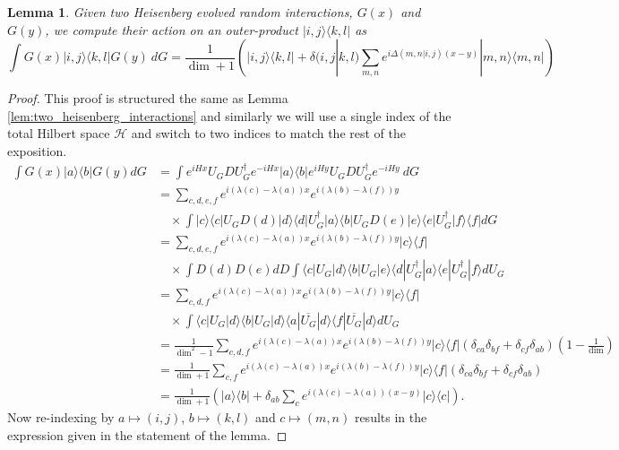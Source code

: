 \documentclass{article}
\newtheorem{lemma}[theorem]{Lemma}
\newcommand{\ket}[1]{|#1\rangle}
\newcommand{\bra}[1]{\langle #1|}
\newcommand{\ketbra}[2]{| #1\rangle\! \langle #2|}
\newcommand{\parens}[1]{\left( #1 \right)}
\newcommand{\hilb}{\mathcal{H}}
\begin{document}
\begin{lemma} \label{lem:sandwiched_interaction}
    Given two Heisenberg evolved random interactions, $G(x)$ and $G(y)$, we compute their action on an outer-product $\ketbra{i,j}{k,l}$ as
    \begin{equation}
        \int G(x) \ketbra{i,j}{k,l} G(y) ~dG = \frac{1}{\dim + 1} \parens{\ketbra{i,j}{k,l} + \delta(i,j|k,l) \sum_{m,n} e^{i \Delta(m,n | i,j) (x-y)} \ketbra{m,n}{m,n}}
    \end{equation}
\end{lemma}
\begin{proof}
This proof is structured the same as Lemma \ref{lem:two_heisenberg_interactions} and similarly we will use a single index of the total Hilbert space $\hilb$ and switch to two indices to match the rest of the exposition.
    \begin{align}
        \int G(x) \ketbra{a}{b} G(y) dG &=  \int e^{i H x} U_G D U_G^{\dagger} e^{-i H x} \ketbra{a}{b} e^{i H y} U_G D U_G^\dagger e^{-i H y} ~dG \\
        &= \sum_{c, d, e, f} e^{i (\lambda(c) - \lambda(a))x} e^{i (\lambda(b) - \lambda(f))y} \nonumber \\
        &\quad \times \int \ketbra{c}{c} U_G D(d) \ketbra{d}{d} U_G^\dagger \ketbra{a}{b} U_G D(e) \ketbra{e}{e} U_G^\dagger \ketbra{f}{f} dG \\
        &= \sum_{c, d, e, f}  e^{i (\lambda(c) - \lambda(a))x} e^{i (\lambda(b) - \lambda(f))y} \ketbra{c}{f} \nonumber \\
        &\quad \times \int D(d) D(e) dD \int \bra{c} U_G \ket{d} \bra{b} U_G \ket{e} \bra{d} U_G^\dagger \ket{a} \bra{e} U_G^\dagger \ket{f} dU_G \\
        &=  \sum_{c,d,f} e^{i (\lambda(c) - \lambda(a))x} e^{i (\lambda(b) - \lambda(f))y} \ketbra{c}{f} \nonumber \\ 
        &\quad \times \int \bra{c} U_G \ket{d} \bra{b} U_G \ket{d} \bra{a} \overline{U_G} \ket{d} \bra{f} \overline{U_G} \ket{d} dU_G \\
        &= \frac{1}{\dim^2 - 1} \sum_{c,d,f} e^{i (\lambda(c) - \lambda(a))x} e^{i (\lambda(b) - \lambda(f))y} \ketbra{c}{f} (\delta_{ca} \delta_{bf} + \delta_{cf}\delta_{ab})\parens{1 - \frac{1}{\dim}} \\
        &= \frac{1}{\dim + 1} \sum_{c,f} e^{i (\lambda(c) - \lambda(a))x} e^{i (\lambda(b) - \lambda(f))y} \ketbra{c}{f} (\delta_{ca} \delta_{bf} + \delta_{cf}\delta_{ab}) \\
        &= \frac{1}{\dim + 1} \parens{\ketbra{a}{b} + \delta_{ab} \sum_{c} e^{i(\lambda(c) - \lambda(a))(x-y)} \ketbra{c}{c} }.
    \end{align}
    Now re-indexing by $a \mapsto (i,j)$, $b \mapsto (k,l)$ and $c \mapsto (m,n)$ results in the expression given in the statement of the lemma.
\end{proof}
\end{document}
